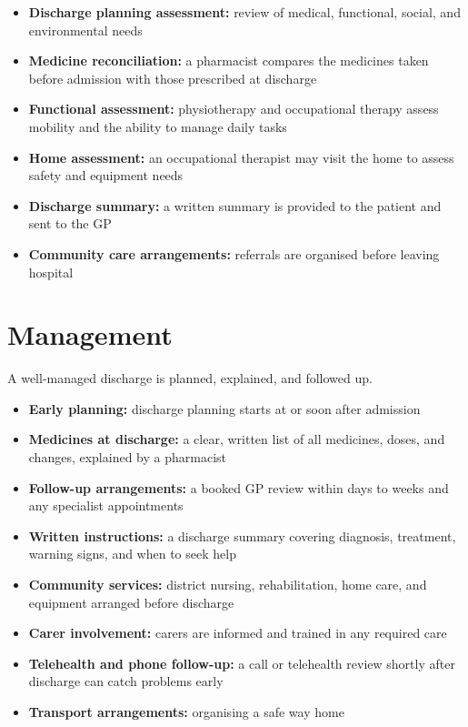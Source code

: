 \begin{itemize}
    \item \textbf{Discharge planning assessment:} review of medical, functional, social, and environmental needs
    \item \textbf{Medicine reconciliation:} a pharmacist compares the medicines taken before admission with those prescribed at discharge
    \item \textbf{Functional assessment:} physiotherapy and occupational therapy assess mobility and the ability to manage daily tasks
    \item \textbf{Home assessment:} an occupational therapist may visit the home to assess safety and equipment needs
    \item \textbf{Discharge summary:} a written summary is provided to the patient and sent to the GP
    \item \textbf{Community care arrangements:} referrals are organised before leaving hospital
\end{itemize}

\section*{Management}
A well-managed discharge is planned, explained, and followed up.

\begin{itemize}
    \item \textbf{Early planning:} discharge planning starts at or soon after admission
    \item \textbf{Medicines at discharge:} a clear, written list of all medicines, doses, and changes, explained by a pharmacist
    \item \textbf{Follow-up arrangements:} a booked GP review within days to weeks and any specialist appointments
    \item \textbf{Written instructions:} a discharge summary covering diagnosis, treatment, warning signs, and when to seek help
    \item \textbf{Community services:} district nursing, rehabilitation, home care, and equipment arranged before discharge
    \item \textbf{Carer involvement:} carers are informed and trained in any required care
    \item \textbf{Telehealth and phone follow-up:} a call or telehealth review shortly after discharge can catch problems early
    \item \textbf{Transport arrangements:} organising a safe way home
\end{itemize}

